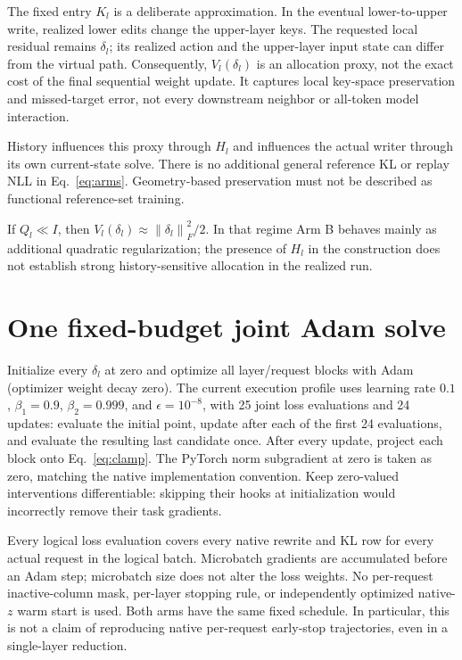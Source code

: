 \documentclass[11pt]{article}
\newcommand{\norm}[1]{\left\lVert#1\right\rVert}
\begin{document}
The fixed entry $K_l$ is a deliberate approximation. In the eventual
lower-to-upper write, realized lower edits change the upper-layer keys.
The requested local residual remains $\delta_l$; its realized action and
the upper-layer input state can differ from the virtual path. Consequently, $V_l(\delta_l)$
is an allocation proxy, not the exact cost of the final sequential weight
update. It captures local key-space preservation and missed-target error,
not every downstream neighbor or all-token model interaction.

History influences this proxy through $H_l$ and influences the actual
writer through its own current-state solve. There is no additional general
reference KL or replay NLL in Eq.~\eqref{eq:arms}. Geometry-based
preservation must not be described as functional reference-set training.

If $Q_l\ll I$, then $V_l(\delta_l)\approx\norm{\delta_l}_F^2/2$.
In that regime Arm B behaves mainly as additional quadratic regularization;
the presence of $H_l$ in the construction does not establish strong
history-sensitive allocation in the realized run.

\clearpage
\section{One fixed-budget joint Adam solve}

Initialize every $\delta_l$ at zero and optimize all layer/request blocks
with Adam (optimizer weight decay zero). The current execution profile
uses learning rate $0.1$, $\beta_1=0.9$, $\beta_2=0.999$, and
$\epsilon=10^{-8}$, with 25 joint loss evaluations and 24 updates: evaluate
the initial point, update after each of the first 24 evaluations, and
evaluate the resulting last candidate once. After every update, project
each block onto Eq.~\eqref{eq:clamp}. The PyTorch norm subgradient at zero
is taken as zero, matching the native implementation convention.
Keep zero-valued interventions differentiable: skipping their hooks at
initialization would incorrectly remove their task gradients.

Every logical loss evaluation covers every native rewrite and KL row for
every actual request in the logical batch. Microbatch gradients are accumulated before an Adam
step; microbatch size does not alter the loss weights. No per-request
inactive-column mask, per-layer stopping rule, or independently optimized
native-$z$ warm start is used. Both arms have the same fixed schedule.
In particular, this is not a claim of reproducing native per-request
early-stop trajectories, even in a single-layer reduction.
\end{document}
